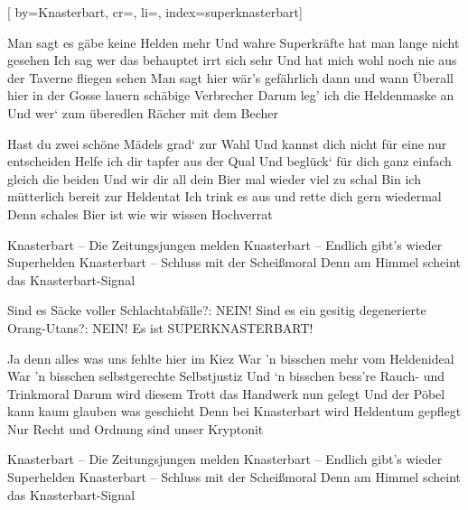 

[%
    by={Knasterbart},
    cr={},
    li={},
    index={superknasterbart}]


    \label{superknasterbart}

    \beginverse\memorize[chorus]
        Man sagt es gäbe keine Helden mehr
        Und wahre Superkräfte hat man lange nicht gesehen
        Ich sag wer das behauptet irrt sich sehr
        Und hat mich wohl noch nie aus der Taverne fliegen sehen
        \brk
        Man sagt hier wär's gefährlich dann und wann
        Überall hier in der Gosse lauern schäbige Verbrecher
        Darum leg' ich die Heldenmaske an
        Und wer‘ zum überedlen Rächer mit dem Becher
    \endverse

    \beginverse\replay[verse]
        Hast du zwei schöne Mädels grad‘ zur Wahl
        Und kannst dich nicht für eine nur entscheiden
        Helfe ich dir tapfer aus der Qual
        Und beglück‘ für dich ganz einfach gleich die beiden
        \brk
        Und wir dir all dein Bier mal wieder viel zu schal
        Bin ich mütterlich bereit zur Heldentat
        Ich trink es aus und rette dich gern wiedermal
        Denn schales Bier ist wie wir wissen Hochverrat
    \endverse

    \beginchorus\replay[chorus]
        Knasterbart – Die Zeitungsjungen melden
        Knasterbart – Endlich gibt's wieder Superhelden
        Knasterbart – Schluss mit der Scheißmoral
        Denn am Himmel scheint das Knasterbart-Signal
    \endchorus

    \beginverse*\memorize[bridge]
        Sind es Säcke voller Schlachtabfälle?: NEIN!
        Sind es ein gesitig degenerierte Orang-Utans?: NEIN!
        Es ist SUPERKNASTERBART!
    \endverse

    \beginverse\replay[verse]
        Ja denn alles was uns fehlte hier im Kiez
        War 'n bisschen mehr vom Heldenideal
        War 'n bisschen selbstgerechte Selbstjustiz
        Und ‘n bisschen bess're Rauch- und Trinkmoral
        \brk
        Darum wird diesem Trott das Handwerk nun gelegt
        Und der Pöbel kann kaum glauben was geschieht
        Denn bei Knasterbart wird Heldentum gepflegt
        Nur Recht und Ordnung sind unser Kryptonit
    \endverse

    \beginchorus\replay[chorus]
        Knasterbart – Die Zeitungsjungen melden
        Knasterbart – Endlich gibt's wieder Superhelden
        Knasterbart – Schluss mit der Scheißmoral
        Denn am Himmel scheint das Knasterbart-Signal
    \endchorus

